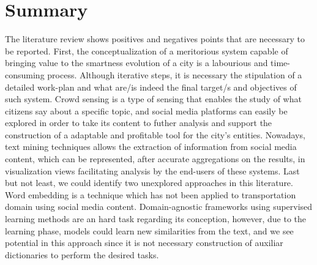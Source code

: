 \section{Summary}

The literature review shows positives and negatives points that are necessary to be reported. First, the conceptualization of a meritorious system capable of bringing value to the smartness evolution of a city is a labourious and time-consuming process. Although iterative steps, it is necessary the stipulation of a detailed work-plan and what are/is indeed the final target/s and objectives of such system. Crowd sensing is a type of sensing that enables the study of what citizens say about a specific topic, and social media platforms can easily be explored in order to take its content to futher analysis and support the construction of a adaptable and profitable tool for the city's entities. Nowadays, text mining techniques allows the extraction of information from social media content, which can be represented, after accurate aggregations on the results, in visualization views facilitating analysis by the end-users of these systems. Last but not least, we could identify two unexplored approaches in this literature. Word embedding is a technique which has not been applied to transportation domain using social media content. Domain-agnostic frameworks using supervised learning methods are an hard task regarding its conception, however, due to the learning phase, models could learn new similarities from the text, and we see potential in this approach since it is not necessary construction of auxiliar dictionaries to perform the desired tasks.